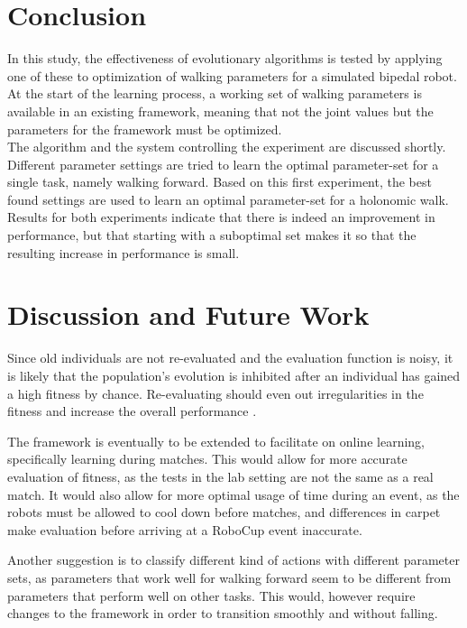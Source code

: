 \documentclass{article}
\begin{document}
\section{Conclusion}
In this study, the effectiveness of evolutionary algorithms is tested by applying one of these to optimization of walking parameters for a simulated bipedal robot. At the start of the learning process, a working set of walking parameters is available in an existing framework, meaning that not the joint values but the parameters for the framework must be optimized.  \\
The algorithm and the system controlling the experiment are discussed shortly. Different parameter settings are tried to learn the optimal parameter-set for a single task, namely walking forward. Based on this first experiment, the best found settings are used to learn an optimal parameter-set for a holonomic walk. Results for both experiments indicate that there is indeed an improvement in performance, but that starting with a suboptimal set makes it so that the resulting increase in performance is small.  \newpage
 
\section{Discussion and Future Work}
Since old individuals are not re-evaluated and the evaluation function is
noisy, it is likely that the population's evolution is inhibited after an
individual has gained a high fitness by chance. Re-evaluating should even out 
irregularities in the fitness and increase the overall performance
\cite{nordin1997line}.

The framework is eventually to be extended to facilitate on
online learning, specifically learning during matches.
This would allow for more accurate evaluation of fitness, as the tests in the 
lab setting are not the same as a real match. It would also allow for more
optimal usage of time during an event, as the robots must be allowed to cool
down before matches, and differences in carpet make evaluation before arriving
at a RoboCup event inaccurate.

Another suggestion is to classify different kind of actions with different
parameter sets, as parameters that work well for walking forward seem to be
different from parameters that perform well on other tasks. This would, however
require changes to the framework in order to transition smoothly and without
falling.




\end{document}
